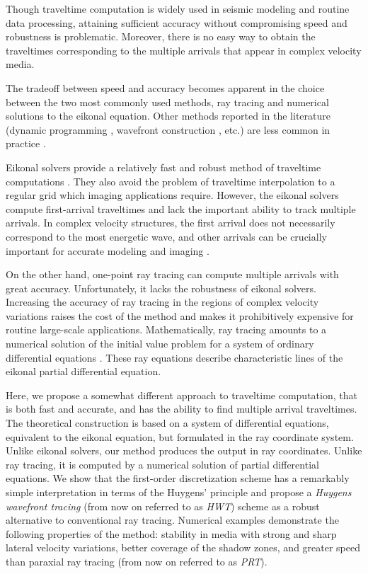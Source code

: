 Though traveltime computation is widely used in seismic modeling and
routine data processing, attaining sufficient accuracy without compromising
speed and robustness is problematic. Moreover, there is no easy way to
obtain the traveltimes corresponding to the multiple arrivals that appear
in complex velocity media.
\par
The tradeoff between speed and accuracy becomes apparent in the choice
between the two most commonly used methods, ray tracing and numerical
solutions to the eikonal equation. Other methods reported in the literature
(dynamic programming \cite[]{GEO56-01-00590067}, wavefront construction
\cite[]{GEO58-08-11571166}, etc.) are less common in practice
\cite[]{Audebert.sep.80.25}.
\par
Eikonal solvers provide a relatively fast and robust method of
traveltime computations \cite[]{GEO55-05-05210526,GEO56-06-08120821}.
They also avoid the problem of traveltime interpolation to a regular
grid which imaging applications require. However, the eikonal solvers
compute first-arrival traveltimes and lack the important ability to
track multiple arrivals. In complex velocity structures, the first
arrival does not necessarily correspond to the most energetic wave,
and other arrivals can be crucially important for accurate modeling
and imaging \cite[]{GEO58-04-05640575,GEO59-05-08100817}.
\par
On the other hand, one-point ray tracing can compute multiple arrivals
with great accuracy. Unfortunately, it lacks the robustness of eikonal
solvers. Increasing the accuracy of ray tracing in the regions of
complex velocity variations raises the cost of the method and makes
it prohibitively expensive for routine large-scale applications.
Mathematically, ray tracing amounts to a numerical solution of the
initial value problem for a system of ordinary differential equations
\cite[]{Cerveny.SeiTom.99.87}.  These ray equations describe
characteristic lines of the eikonal partial differential equation.
\par
Here, we propose a somewhat different approach to traveltime computation,
that is both fast and accurate, and has the ability to find multiple
arrival traveltimes. The theoretical construction is based on a system of
differential equations, equivalent to the eikonal equation, but formulated
in the ray coordinate system. Unlike eikonal solvers, our method produces
the output in ray coordinates. Unlike ray tracing, it is computed by a
numerical solution of partial differential equations. We show that the
first-order discretization scheme has a remarkably simple interpretation in
terms of the Huygens' principle and propose a \emph{Huygens wavefront
tracing} (from now on referred to as \emph{HWT}) scheme as a robust
alternative to conventional ray tracing. Numerical examples demonstrate the
following properties of the method: stability in media with strong and
sharp lateral velocity variations, better coverage of the shadow zones, and
greater speed than paraxial ray tracing (from now on referred to as
\emph{PRT}).

